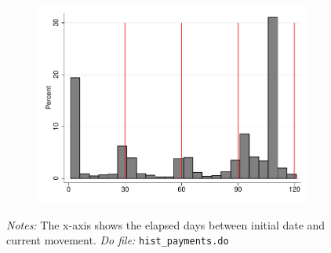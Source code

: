 \documentclass[11pt]{article}
\begin{document}
\begin{figure}[H]
\begin{center}
\begin{subfigure}{.31\textwidth}
        \includegraphics[width=\textwidth]{Figuras/hist_payments_pro_9.pdf}    
    \end{subfigure}        
    \end{center}
     \footnotesize \textit{Notes: } The x-axis shows the elapsed days between initial date and current movement.
      \footnotesize{ \textit{Do file: }  \texttt{hist\_payments.do}}
\end{figure}

\end{document}
